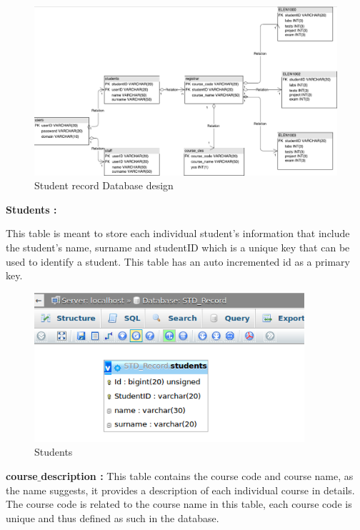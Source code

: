\begin{itemize}
\begin{center}
\begin{figure}[h]
\centering
\includegraphics[width=14cm]{OverallDesign}
\caption{Student record Database design}
\end{figure}
\end{center}

\clearpage
\textbf{Students :}

This table is meant to store each individual student's information that include the student's name, surname and studentID which is a unique key that can be used to identify a student. This table has an auto incremented id as a primary key.  

\begin{center}
\begin{figure}[h]
\centering
\includegraphics[width=10cm]{Students}
\caption{Students}
\end{figure}
\end{center}


\textbf{course$\_$description :}
This table contains the course code and course name, as the name suggests, it provides a description of each individual course in details. The course code is related to the course name in this table, each course code is unique and thus defined as such in the database.  


\end{itemize}
